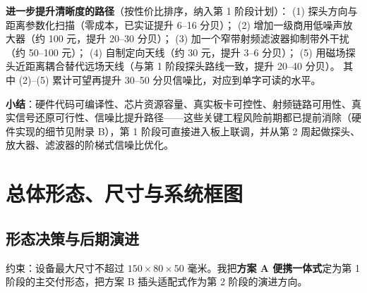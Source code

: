 \documentclass[a4paper,11pt,oneside,UTF8,scheme=plain]{ctexart}
\begin{document}
\textbf{进一步提升清晰度的路径}（按性价比排序，纳入第 1 阶段计划）：
(1) 探头方向与距离参数化扫描（零成本，已实证提升 6--16 分贝）；
(2) 增加一级商用低噪声放大器（约 100 元，提升 20--30 分贝）；
(3) 加一个窄带射频滤波器抑制带外干扰（约 50--100 元）；
(4) 自制定向天线（约 30 元，提升 3--6 分贝）；
(5) 用磁场探头近距离耦合替代远场天线（与第 1 阶段探头路线一致，提升 20--40 分贝）。
其中 (2)--(5) 累计可望再提升 30--50 分贝信噪比，对应到单字可读的水平。

\textbf{小结}：硬件代码可编译性、芯片资源容量、真实板卡可控性、射频链路可用性、真实信号还原可行性、信噪比提升路径——这些关键工程风险前期都已提前消除（硬件实现的细节见附录 B），第 1 阶段可直接进入板上联调，并从第 2 周起做探头、放大器、滤波器的阶梯式信噪比优化。

\section{总体形态、尺寸与系统框图}
\label{sec:overview}

\subsection{形态决策与后期演进}
\label{sec:form-factor}

约束：设备最大尺寸不超过 \(150 \times 80 \times 50\) 毫米。我把\textbf{方案 A 便携一体式}定为第 1 阶段的主交付形态，把方案 B 插头适配式作为第 2 阶段的演进方向。
\end{document}
